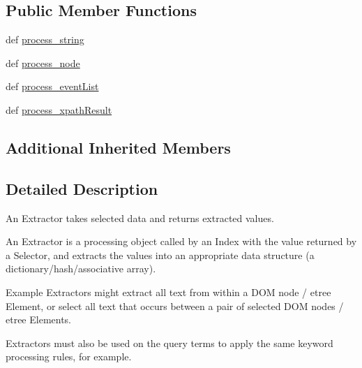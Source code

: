 \subsection*{Public Member Functions}
\begin{DoxyCompactItemize}
\item 
def \hyperlink{classcheshire3_1_1base_objects_1_1_extractor_a4fc29b716e1f858845da471532efcc29}{process\-\_\-string}
\item 
def \hyperlink{classcheshire3_1_1base_objects_1_1_extractor_abe58fb4256ab9adc9dc5efb3547e445c}{process\-\_\-node}
\item 
def \hyperlink{classcheshire3_1_1base_objects_1_1_extractor_a4d0d105e26451043cc063b0c4a7a1318}{process\-\_\-event\-List}
\item 
def \hyperlink{classcheshire3_1_1base_objects_1_1_extractor_a7778f0cb1e5959b0cc9c3829e2d8b748}{process\-\_\-xpath\-Result}
\end{DoxyCompactItemize}
\subsection*{Additional Inherited Members}


\subsection{Detailed Description}
\begin{DoxyVerb}An Extractor takes selected data and returns extracted values.

An Extractor is a processing object called by an Index with the value 
returned by a Selector, and extracts the values into an appropriate data 
structure (a dictionary/hash/associative array).

Example Extractors might extract all text from within a DOM node / etree 
Element, or select all text that occurs between a pair of selected DOM 
nodes / etree Elements.

Extractors must also be used on the query terms to apply the same keyword 
processing rules, for example.
\end{DoxyVerb}
 

